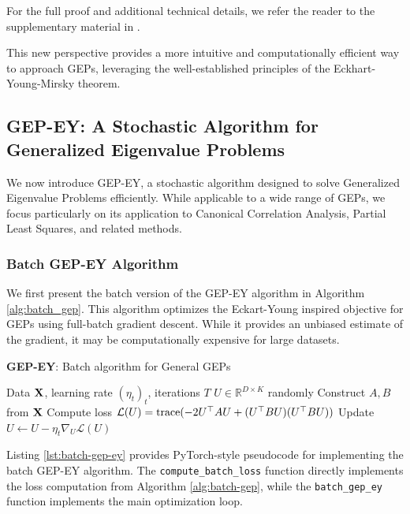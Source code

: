 For the full proof and additional technical details, we refer the reader to the supplementary material in \citet{chapman2023efficient}.

This new perspective provides a more intuitive and computationally efficient way to approach GEPs, leveraging the well-established principles of the Eckhart-Young-Mirsky theorem.

\subsection{GEP-EY: A Stochastic Algorithm for Generalized Eigenvalue Problems}

We now introduce GEP-EY, a stochastic algorithm designed to solve Generalized Eigenvalue Problems efficiently. While applicable to a wide range of GEPs, we focus particularly on its application to Canonical Correlation Analysis, Partial Least Squares, and related methods.

\subsubsection{Batch GEP-EY Algorithm}

We first present the batch version of the GEP-EY algorithm in Algorithm \ref{alg:batch_gep}. This algorithm optimizes the Eckart-Young inspired objective for GEPs using full-batch gradient descent. While it provides an unbiased estimate of the gradient, it may be computationally expensive for large datasets.

\begin{algorithm}
\caption{\textbf{GEP-EY}: Batch algorithm for General GEPs}
\label{alg:batch-gep}
\begin{algorithmic}
 Data $\mathbf{X}$, learning rate $(\eta_t)_t$, iterations $T$
 $U \in \mathbb{R}^{D \times K}$ randomly
\STATE Construct $A, B$ from $\mathbf{X}$
\STATE Compute loss $\mathcal{L}(U) = \operatorname{trace}(-2U^\top A U + (U^\top B U)(U^\top B U))$
\STATE Update $U \leftarrow U - \eta_t \nabla_U \mathcal{L}(U)$
\ENDFOR
\end{algorithmic}
\end{algorithm}

Listing \ref{lst:batch-gep-ey} provides PyTorch-style pseudocode for implementing the batch GEP-EY algorithm. The \texttt{compute\_batch\_loss} function directly implements the loss computation from Algorithm \ref{alg:batch-gep}, while the \texttt{batch\_gep\_ey} function implements the main optimization loop.

